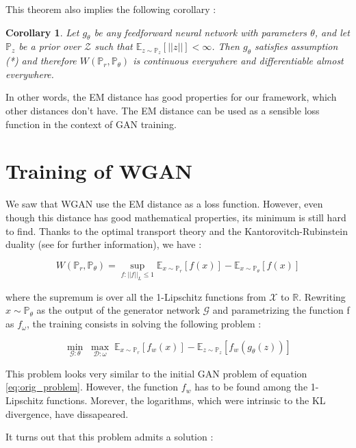 \documentclass[a4paper]{report}
\newcommand{\G}{\mathcal{G}}
\newcommand{\D}{\mathcal{D}}
\newcommand{\X}{\mathcal{X}}
\newcommand{\Expec}{\mathbb{E}}
\newcommand{\Prob}{\mathbb{P}}
\newcommand{\real}{\mathbb{R}}
\theoremstyle{plain}
\newtheorem{corol}{Corollary}
\theoremstyle{remark}
\theoremstyle{definition}
\begin{document}
This theorem also implies the following corollary :
\begin{corol}
Let $g_\theta$ be any feedforward neural network with parameters $\theta$, and let $\Prob_z$
be a prior over $\mathcal{Z}$ such that $\Expec_{z \sim \Prob_z}[||z||] < \infty$.
Then $g_\theta$ satisfies assumption (*) and therefore $W(\Prob_r , \Prob_\theta)$ is continuous everywhere and differentiable almost everywhere.
\end{corol}

In other words, the EM distance has good properties for our framework, which other distances don't have. The EM distance can be used as a sensible loss function in the context of GAN training.

\section{Training of WGAN}

We saw that WGAN use the EM distance as a loss function. However, even though this distance has good mathematical properties, its minimum is still hard to find. Thanks to the optimal transport theory and the Kantorovitch-Rubinstein duality (see \cite{villani2008optimal} for further information), we have :

\begin{equation}
\label{eq:WGANprob}
W(\Prob_r , \Prob_\theta) = \sup_{f : ||f||_L \leqslant 1} \Expec_{x \sim \Prob_r}[f(x)] - \Expec_{x \sim \Prob_\theta} [f(x)]
\end{equation}

 
 where the supremum is over all the 1-Lipschitz functions from $\X$ to $\real$. Rewriting $x \sim \Prob_\theta$ as the output of the generator network $\G$ and parametrizing the function f as $f_\omega$, the training consists in solving the following problem :
 
\begin{equation}
\label{eq:WGAN}
 \min_{\G : \theta} \; \max_{\D : \omega} \; \Expec_{x \sim \Prob_r} [f_w(x)] - \Expec_{z \sim \Prob_z} [f_w(g_\theta(z))]
\end{equation}

This problem looks very similar to the initial GAN problem of equation \ref{eq:orig_problem}. However, the function $f_w$ has to be found among the 1-Lipschitz functions. Morever, the logarithms, which were intrinsic to the KL divergence, have dissapeared.

It turns out that this problem admits a solution :
\end{document}

